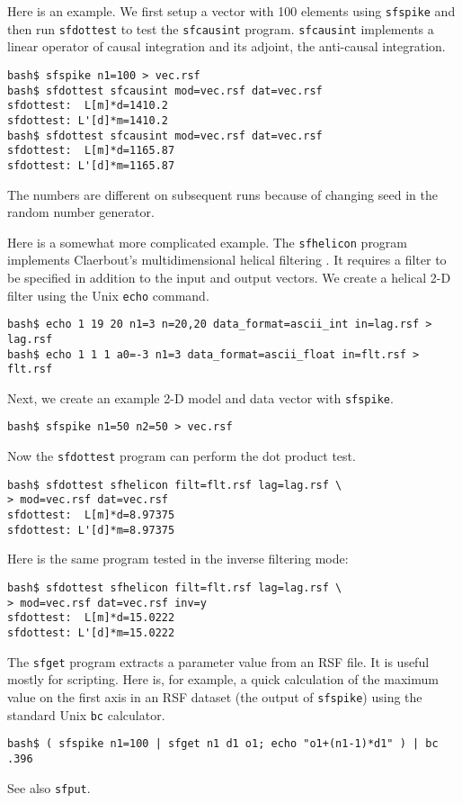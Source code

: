 Here is an example. We first setup a vector with 100 elements using
\texttt{sfspike} and then run \texttt{sfdottest} to test the
\texttt{sfcausint} program. \texttt{sfcausint} implements a linear
operator of causal integration and its adjoint, the anti-causal
integration.
\begin{verbatim}
bash$ sfspike n1=100 > vec.rsf
bash$ sfdottest sfcausint mod=vec.rsf dat=vec.rsf
sfdottest:  L[m]*d=1410.2
sfdottest: L'[d]*m=1410.2
bash$ sfdottest sfcausint mod=vec.rsf dat=vec.rsf
sfdottest:  L[m]*d=1165.87
sfdottest: L'[d]*m=1165.87
\end{verbatim}
The numbers are different on subsequent runs because of changing
seed in the random number generator.

Here is a somewhat more complicated example. The \texttt{sfhelicon}
program implements Claerbout's multidimensional helical filtering
\cite[]{GEO63-05-15321541}. It requires a filter to be specified in
addition to the input and output vectors. We create a helical 
2-D filter using the Unix \texttt{echo} command.
\begin{verbatim}
bash$ echo 1 19 20 n1=3 n=20,20 data_format=ascii_int in=lag.rsf > lag.rsf
bash$ echo 1 1 1 a0=-3 n1=3 data_format=ascii_float in=flt.rsf > flt.rsf
\end{verbatim}
Next, we create an example 2-D model and data vector with \texttt{sfspike}.
\begin{verbatim}
bash$ sfspike n1=50 n2=50 > vec.rsf
\end{verbatim}
Now the \texttt{sfdottest} program can perform the dot product test.
\begin{verbatim}
bash$ sfdottest sfhelicon filt=flt.rsf lag=lag.rsf \
> mod=vec.rsf dat=vec.rsf
sfdottest:  L[m]*d=8.97375
sfdottest: L'[d]*m=8.97375
\end{verbatim}
Here is the same program tested in the inverse filtering mode:
\begin{verbatim}
bash$ sfdottest sfhelicon filt=flt.rsf lag=lag.rsf \
> mod=vec.rsf dat=vec.rsf inv=y
sfdottest:  L[m]*d=15.0222
sfdottest: L'[d]*m=15.0222
\end{verbatim}

\noindent\doublebox{\parbox{\textwidth}{

}}

The \texttt{sfget} program extracts a parameter value from an RSF file. It is
useful mostly for scripting. Here is, for example, a quick calculation of the
maximum value on the first axis in an RSF dataset (the output of
\texttt{sfspike}) using the standard Unix \texttt{bc} calculator.
\begin{verbatim}
bash$ ( sfspike n1=100 | sfget n1 d1 o1; echo "o1+(n1-1)*d1" ) | bc
.396
\end{verbatim}
See also \texttt{sfput}.

